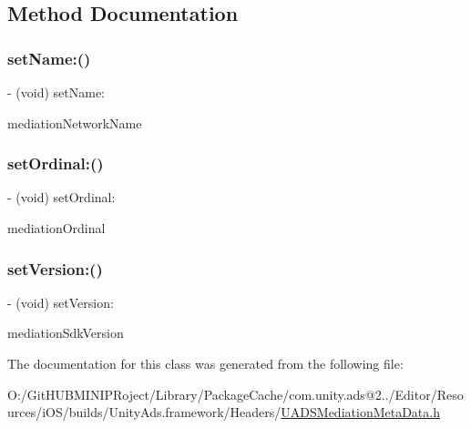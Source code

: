 \subsection{Method Documentation}
\mbox{\label{interface_u_a_d_s_mediation_meta_data_a3597aac41b79b3e8ad1db1f5331b3331}} 
\subsubsection{\texorpdfstring{setName:()}{setName:()}}
{\footnotesize\ttfamily -\/ (void) set\+Name\+: \begin{DoxyParamCaption}\item[{(N\+S\+String $\ast$)}]{mediation\+Network\+Name }\end{DoxyParamCaption}}

\mbox{\label{interface_u_a_d_s_mediation_meta_data_a870990c2a08f4153b71dbc6db30f5090}} 
\subsubsection{\texorpdfstring{setOrdinal:()}{setOrdinal:()}}
{\footnotesize\ttfamily -\/ (void) set\+Ordinal\+: \begin{DoxyParamCaption}\item[{(int)}]{mediation\+Ordinal }\end{DoxyParamCaption}}

\mbox{\label{interface_u_a_d_s_mediation_meta_data_a7852264d4512e6337ad780317bae68bb}} 
\subsubsection{\texorpdfstring{setVersion:()}{setVersion:()}}
{\footnotesize\ttfamily -\/ (void) set\+Version\+: \begin{DoxyParamCaption}\item[{(N\+S\+String $\ast$)}]{mediation\+Sdk\+Version }\end{DoxyParamCaption}}



The documentation for this class was generated from the following file\+:\begin{DoxyCompactItemize}
\item 
O\+:/\+Git\+H\+U\+B\+M\+I\+N\+I\+P\+Roject/\+Library/\+Package\+Cache/com.\+unity.\+ads@2../\+Editor/\+Resources/i\+O\+S/builds/\+Unity\+Ads.\+framework/\+Headers/\mbox{\hyperlink{_u_a_d_s_mediation_meta_data_8h}{U\+A\+D\+S\+Mediation\+Meta\+Data.\+h}}\end{DoxyCompactItemize}
